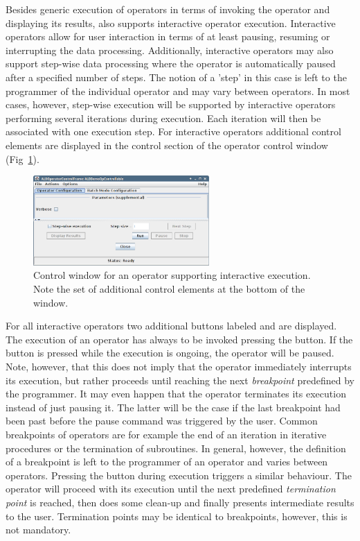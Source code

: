\vspace*{-0.75cm}
Besides generic execution of operators in terms of invoking the operator and
displaying its results, \alida also supports interactive operator execution.
Interactive operators allow for user interaction in terms of at least pausing, resuming
or interrupting the data processing. Additionally, interactive operators may also support
step-wise data processing where the operator is automatically paused after a specified number of
steps. The notion of a 'step' in this case is left to the programmer of the individual operator
and may vary between operators. In most cases, however, step-wise execution will be supported
by interactive operators performing several iterations during execution. Each iteration
will then be associated with one execution step. For interactive operators additional control
elements are displayed in the control section of the operator control window
(Fig~\ref{fig:OpControllable}).

\begin{figure}
\begin{center}
\includegraphics[width=0.6\textwidth]{../images/screenShotOpControllable.png}
\caption{\label{fig:OpControllable}Control window for an operator supporting
interactive execution. Note the set of additional control elements at the bottom
of the window.}
\end{center}
\vspace*{-0.5cm}
\end{figure}
For all interactive operators two additional buttons labeled  and  are
displayed. The execution of an operator has always to be invoked pressing the  button.
If the  button is pressed while the execution is ongoing, the operator will be
paused. Note, however, that this does not imply that the operator immediately interrupts its
execution, but rather proceeds until reaching the next {\em breakpoint} predefined by the
programmer. It may even happen that the operator terminates its execution instead of just pausing
it. The latter will be the case if the last breakpoint had been past before the pause command was
triggered by the user. Common breakpoints of operators are for example the end of an iteration in
iterative procedures or the termination of subroutines. In general, however, the definition of a
breakpoint is left to the programmer of an operator and varies between operators. Pressing the
 button during execution triggers a similar behaviour. The operator will proceed
with its execution until the next predefined {\em termination point} is reached, then does some
clean-up and finally presents intermediate results to the user. Termination points may be identical 
to breakpoints, however, this is not mandatory.

